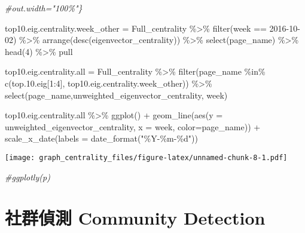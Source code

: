 \documentclass[
]{article}
\newenvironment{Shaded}{\begin{snugshade}}{\end{snugshade}}
\newcommand{\AttributeTok}[1]{\textcolor[rgb]{0.77,0.63,0.00}{#1}}
\newcommand{\CommentTok}[1]{\textcolor[rgb]{0.56,0.35,0.01}{\textit{#1}}}
\newcommand{\DecValTok}[1]{\textcolor[rgb]{0.00,0.00,0.81}{#1}}
\newcommand{\FloatTok}[1]{\textcolor[rgb]{0.00,0.00,0.81}{#1}}
\newcommand{\FunctionTok}[1]{\textcolor[rgb]{0.00,0.00,0.00}{#1}}
\newcommand{\NormalTok}[1]{#1}
\newcommand{\OtherTok}[1]{\textcolor[rgb]{0.56,0.35,0.01}{#1}}
\newcommand{\SpecialCharTok}[1]{\textcolor[rgb]{0.00,0.00,0.00}{#1}}
\newcommand{\StringTok}[1]{\textcolor[rgb]{0.31,0.60,0.02}{#1}}
\begin{document}
\begin{Shaded}
\begin{Highlighting}[]
\CommentTok{\#out.width="100\%"\}}

\NormalTok{top10.eig.centrality.week\_other }\OtherTok{=}\NormalTok{ Full\_centrality }\SpecialCharTok{\%\textgreater{}\%} \FunctionTok{filter}\NormalTok{(week }\SpecialCharTok{==} \StringTok{\textquotesingle{}2016{-}10{-}02\textquotesingle{}}\NormalTok{) }\SpecialCharTok{\%\textgreater{}\%} \FunctionTok{arrange}\NormalTok{(}\FunctionTok{desc}\NormalTok{(eigenvector\_centrality)) }\SpecialCharTok{\%\textgreater{}\%} \FunctionTok{select}\NormalTok{(page\_name) }\SpecialCharTok{\%\textgreater{}\%} \FunctionTok{head}\NormalTok{(}\DecValTok{4}\NormalTok{) }\SpecialCharTok{\%\textgreater{}\%}\NormalTok{ pull}


\NormalTok{top10.eig.centrality.all }\OtherTok{=}\NormalTok{ Full\_centrality }\SpecialCharTok{\%\textgreater{}\%} \FunctionTok{filter}\NormalTok{(page\_name }\SpecialCharTok{\%in\%} \FunctionTok{c}\NormalTok{(top.}\FloatTok{10.}\NormalTok{eig[}\DecValTok{1}\SpecialCharTok{:}\DecValTok{4}\NormalTok{], top10.eig.centrality.week\_other)) }\SpecialCharTok{\%\textgreater{}\%} \FunctionTok{select}\NormalTok{(page\_name,unweighted\_eigenvector\_centrality, week)}


\NormalTok{top10.eig.centrality.all }\SpecialCharTok{\%\textgreater{}\%} \FunctionTok{ggplot}\NormalTok{() }\SpecialCharTok{+} 
  \FunctionTok{geom\_line}\NormalTok{(}\FunctionTok{aes}\NormalTok{(}\AttributeTok{y =}\NormalTok{ unweighted\_eigenvector\_centrality, }\AttributeTok{x =}\NormalTok{ week, }\AttributeTok{color=}\NormalTok{page\_name)) }\SpecialCharTok{+}
  \FunctionTok{scale\_x\_date}\NormalTok{(}\AttributeTok{labels =} \FunctionTok{date\_format}\NormalTok{(}\StringTok{"\%Y{-}\%m{-}\%d"}\NormalTok{))}
\end{Highlighting}
\end{Shaded}

\texttt{[image: graph\_centrality\_files/figure-latex/unnamed-chunk-8-1.pdf]}

\begin{Shaded}
\begin{Highlighting}[]
\CommentTok{\#ggplotly(p)}
\end{Highlighting}
\end{Shaded}

\hypertarget{ux793eux7fa4ux5075ux6e2c-community-detection}{%
\section{社群偵測 Community
Detection}\label{ux793eux7fa4ux5075ux6e2c-community-detection}}
\end{document}
